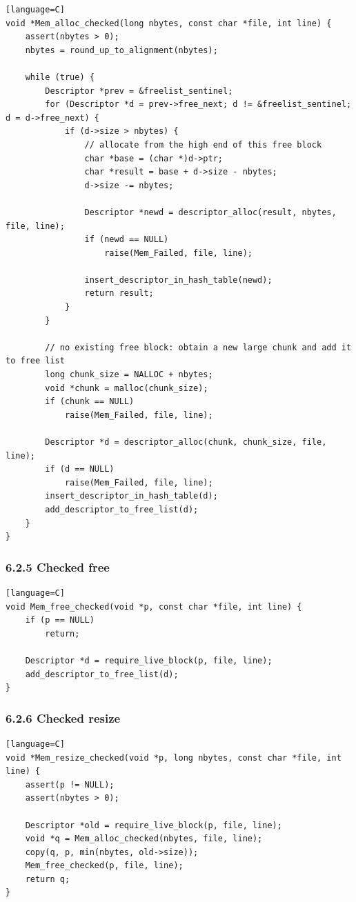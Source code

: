 \documentclass[11pt]{article}
\begin{document}
\begin{verbatim}[language=C]
void *Mem_alloc_checked(long nbytes, const char *file, int line) {
    assert(nbytes > 0);
    nbytes = round_up_to_alignment(nbytes);

    while (true) {
        Descriptor *prev = &freelist_sentinel;
        for (Descriptor *d = prev->free_next; d != &freelist_sentinel; d = d->free_next) {
            if (d->size > nbytes) {
                // allocate from the high end of this free block
                char *base = (char *)d->ptr;
                char *result = base + d->size - nbytes;
                d->size -= nbytes;

                Descriptor *newd = descriptor_alloc(result, nbytes, file, line);
                if (newd == NULL)
                    raise(Mem_Failed, file, line);

                insert_descriptor_in_hash_table(newd);
                return result;
            }
        }

        // no existing free block: obtain a new large chunk and add it to free list
        long chunk_size = NALLOC + nbytes;
        void *chunk = malloc(chunk_size);
        if (chunk == NULL)
            raise(Mem_Failed, file, line);

        Descriptor *d = descriptor_alloc(chunk, chunk_size, file, line);
        if (d == NULL)
            raise(Mem_Failed, file, line);
        insert_descriptor_in_hash_table(d);
        add_descriptor_to_free_list(d);
    }
}
\end{verbatim}

\subsubsection{6.2.5 Checked free}\label{checked-free}

\begin{verbatim}[language=C]
void Mem_free_checked(void *p, const char *file, int line) {
    if (p == NULL)
        return;

    Descriptor *d = require_live_block(p, file, line);
    add_descriptor_to_free_list(d);
}
\end{verbatim}

\subsubsection{6.2.6 Checked resize}\label{checked-resize}

\begin{verbatim}[language=C]
void *Mem_resize_checked(void *p, long nbytes, const char *file, int line) {
    assert(p != NULL);
    assert(nbytes > 0);

    Descriptor *old = require_live_block(p, file, line);
    void *q = Mem_alloc_checked(nbytes, file, line);
    copy(q, p, min(nbytes, old->size));
    Mem_free_checked(p, file, line);
    return q;
}
\end{verbatim}
\end{document}
